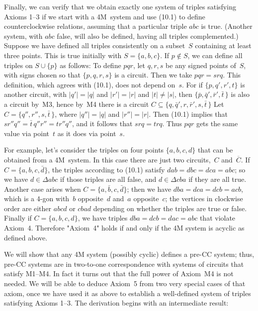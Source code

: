 Finally, we can verify that we obtain exactly one system of triples
satisfying Axioms 1--3 if we start with a 4M~system and use (10.1) to
define counterclockwise relations, assuming that a particular triple
$abc$ is true. (Another system, with $abc$ false, will also be
defined, having all triples complemented.) Suppose we have defined all
triples consistently on a subset~$S$ containing at least three points.
This is true initially with $S=\{a,b,c\}$. If $p\notin S$, we can
define all triples on $S\cup\{p\}$ as follows: To define $pqr$, let
$q,r,s$ be any signed points of~$S$, with signs chosen so that
$\{p,q,r,s\}$ is a circuit. Then we take $pqr=srq$. This definition,
which agrees with (10.1), does not depend on~$s$. For if
$\{p,q',r',t\}$ is another circuit, with $\vert q'\vert=\vert q\vert$
and $\vert r'\vert=\vert r\vert$ and $\vert t\vert\neq\vert s\vert$,
then $\{\bar{p},\bar{q}',\bar{r}',\bar{t}\,\}$ is also a circuit by~M3,
hence by~M4 there is a circuit
$C\subseteq\{q,\bar{q}',r,\bar{r}',s,\bar{t}\,\}$
Let $C=\{q'',r'',s,\bar{t}\,\}$, where $\vert q''\vert=\vert q\vert$ and
$\vert r''\vert=\vert r\vert$. Then (10.1) implies that
$sr''q''=\bar{t}\,q''r''=tr''q''$, and it follows that $srq=trq$. Thus
$pqr$ gets the same value via point~$t$ as it does via point~$s$.

For example, let's consider the triples on four points $\{a,b,c,d\}$
that can be obtained from a 4M~system. In this case there are just two
circuits,~$C$ and~$\overline{C}$. If $C=\{a,b,c,\bar{d}\}$, the
triples according to (10.1) satisfy $dab=dbc=dca=abc$; so we have
$d\in\Delta abc$ if those triples are all false, and $d\in\Delta cba$ if
they are all true. Another case arises when
$C=\{a,\bar{b},c,\bar{d}\}$; then we have $dba=dca=dcb=acb$, which is
a 4-gon with~$b$ opposite~$d$ and~$a$ opposite~$c$; the vertices in
clockwise order are either $abcd$ or $cbad$ depending on whether the
triples are true or false. Finally if $C=\{a,b,c,d\}$, we have triples
$dba=dcb=dac=abc$ that violate Axiom~4. Therefore "Axiom~4" holds if and
only if the 4M system is acyclic as defined above.

We will show that any 4M system (possibly cyclic) defines a pre-CC
system; thus, pre-CC systems are in two-to-one correspondence with
systems of circuits that satisfy M1--M4. In fact it turns out that the
full power of Axiom~M4 is not needed. We will be able to deduce
Axiom~5 from two very special cases of that axiom, once we have used
it as above to establish a well-defined system of triples satisfying Axioms
1--3.
The derivation begins with an intermediate result:

